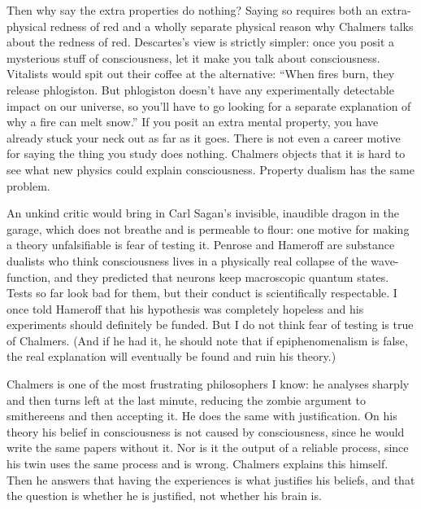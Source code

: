 Then why say the extra properties do nothing? Saying so requires both an extra-physical redness of red and a wholly separate physical reason why Chalmers talks about the redness of red. Descartes's view is strictly simpler: once you posit a mysterious stuff of consciousness, let it make you talk about consciousness.  Vitalists would spit out their coffee at the alternative: ``When fires burn, they release phlogiston. But phlogiston doesn't have any experimentally detectable impact on our universe, so you'll have to go looking for a separate explanation of why a fire can melt snow.'' If you posit an extra mental property, you have already stuck your neck out as far as it goes. There is not even a career motive for saying the thing you study does nothing. Chalmers objects that it is hard to see what new physics could explain consciousness. Property dualism has the same problem. 

An unkind critic would bring in Carl Sagan's invisible, inaudible dragon in the garage, which does not breathe and is permeable to flour: one motive for making a theory unfalsifiable is fear of testing it. Penrose and Hameroff are substance dualists who think consciousness lives in a physically real collapse of the wave-function, and they predicted that neurons keep macroscopic quantum states. Tests so far look bad for them, but their conduct is scientifically respectable.  I once told Hameroff that his hypothesis was completely hopeless and his experiments should definitely be funded. But I do not think fear of testing is true of Chalmers. (And if he had it, he should note that if epiphenomenalism is false, the real explanation will eventually be found and ruin his theory.)

Chalmers is one of the most frustrating philosophers I know: he analyses sharply and then turns left at the last minute, reducing the zombie argument to smithereens and then accepting it. He does the same with justification. On his theory his belief in consciousness is not caused by consciousness, since he would write the same papers without it. Nor is it the output of a reliable process, since his twin uses the same process and is wrong. Chalmers explains this himself. Then he answers that having the experiences is what justifies his beliefs, and that the question is whether he is justified, not whether his brain is. 

